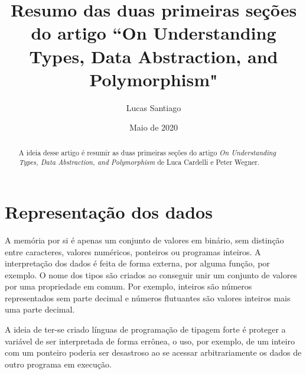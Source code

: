 \documentclass{article}
\title{Resumo das duas primeiras seções do artigo ``On Understanding Types, Data Abstraction, and Polymorphism"}
\author{Lucas Santiago}
\date{Maio de 2020}
\begin{document}
\maketitle

\begin{abstract}
    A ideia desse artigo é resumir as duas primeiras seções do artigo \emph{On Understanding Types, Data Abstraction, and Polymorphism} de Luca Cardelli e Peter Wegner.

\end{abstract}

\section{Representação dos dados}

\hspace{10pt} A memória por si é apenas um conjunto de valores em binário, sem distinção entre caracteres, valores numéricos, ponteiros ou programas inteiros. A interpretação dos dados é feita de forma externa, por alguma função, por exemplo.
O nome dos tipos são criados ao conseguir unir um conjunto de valores por uma propriedade em comum. Por exemplo, inteiros são números representados sem parte decimal e números flutuantes são valores inteiros mais uma parte decimal.

A ideia de ter-se criado línguas de programação de tipagem forte é proteger a variável de ser interpretada de forma errônea, o uso, por exemplo, de um inteiro com um ponteiro poderia ser desastroso ao se acessar arbitrariamente os dados de outro programa em execução. 
\end{document}

